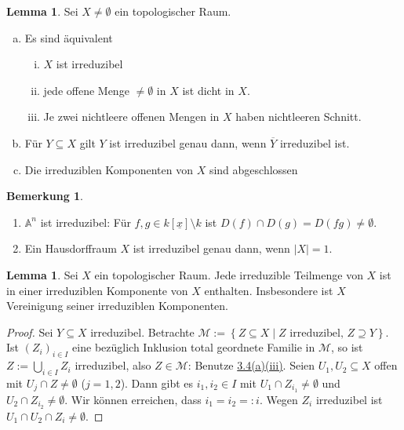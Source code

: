 \documentclass[
twoside=semi,
fontsize=12,
DIV=12, 
cleardoublepage=current,
leqno,
headings=optiontoheadandtoc, 
toc=idx
]{scrbook}
\newcommand{\A}{\mathbb{A}}
\newcommand{\x}{\underline{x}}
\newcommand{\set}[1]{\left\{ #1 \right\}}
\theoremstyle{definition}
\newtheorem{bemerkung}[definition]{Bemerkung}
\newtheorem{lemma}[definition]{Lemma}
\begin{document}
	\begin{lemma}\label{1.3.4}\hfill\newline
		Sei $X \neq \emptyset$ ein topologischer Raum.
		\begin{enumerate}[(a)]
			\item Es sind \"aquivalent
			\begin{enumerate}[(i)]
				\item $X$ ist irreduzibel
				\item jede offene Menge $\neq \emptyset$ in $X$ ist dicht in $X$.
 				\item Je zwei nichtleere offenen Mengen in $X$ haben nichtleeren Schnitt.
			\end{enumerate}
			
			\item F\"ur $Y \subseteq X$ gilt $Y$ ist irreduzibel genau dann, wenn $\overline{Y}$ irreduzibel ist.
			
			\item Die irreduziblen Komponenten von $X$ sind abgeschlossen
		\end{enumerate}
	\end{lemma}

	\begin{bemerkung}\label{1.3.5}\hfill
		\begin{enumerate}[1.]
			\item $\A^n$ ist irreduzibel: F\"ur $f, g\in k[\x] \setminus k$ ist $D(f) \cap D(g) = D(fg) \neq \emptyset$.
			\item Ein Hausdorffraum $X$ ist irreduzibel genau dann, wenn $|X| = 1$.
		\end{enumerate}
	\end{bemerkung}

	\begin{lemma}\label{1.3.6}\hfill\newline
		Sei $X$ ein topologischer Raum. Jede irreduzible Teilmenge von $X$ ist in einer irreduziblen Komponente von $X$ enthalten. Insbesondere ist $X$ Vereinigung seiner irreduziblen Komponenten.
	\end{lemma}

	\begin{proof}
		Sei $Y \subseteq X$ irreduzibel. Betrachte $\mathcal{M} := \set{Z \subseteq X \mid Z \textrm{ irreduzibel, } Z \supseteq Y}$. Ist $(Z_i)_{i \in I}$ eine bez\"uglich Inklusion total geordnete Familie in $\mathcal{M}$, so ist $Z:= \bigcup_{i \in I}Z_i$ irreduzibel, also $Z \in \mathcal{M}$: Benutze \hyperref[1.3.4]{3.4(a)(iii)}. Seien $U_1, U_2 \subseteq X$ offen mit $U_j \cap Z \neq \emptyset$ ($j = 1, 2$). Dann gibt es $i_1, i_2 \in I$ mit $U_1 \cap Z_{i_1} \neq \emptyset$ und $U_2 \cap Z_{i_2} \neq \emptyset$. Wir k\"onnen erreichen, dass $i_1 = i_2 =:i$. Wegen $Z_i$ irreduzibel ist $U_1 \cap U_2 \cap Z_i \neq \emptyset$.
	\end{proof}
\end{document}
